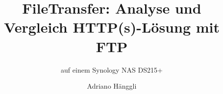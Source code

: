 \documentclass{ffhsthesis}
\begin{document}
\title{FileTransfer: Analyse und Vergleich HTTP(s)-Lösung mit FTP}
\subtitle{auf einem Synology NAS DS215+} %
\author{Adriano Hänggli}


\maketitle



\tableofcontents








\startThesis %


\listoffigures 

\listoftables

% 
\printbibliography

\newpage
\end{document}
